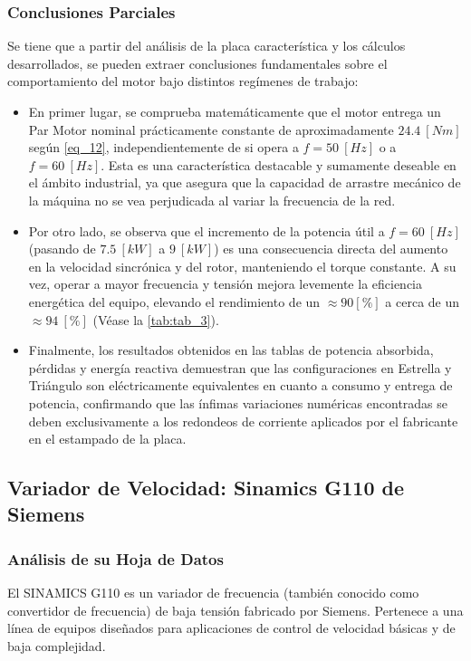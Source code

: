\documentclass[12pt,a4paper]{article}
\begin{document}
\subsubsection{Conclusiones Parciales}
Se tiene que a partir del análisis de la placa característica y los cálculos desarrollados, se pueden extraer conclusiones fundamentales sobre el comportamiento del motor bajo distintos regímenes de trabajo:
\begin{itemize}
    \item En primer lugar, se comprueba matemáticamente que el motor entrega un Par Motor nominal prácticamente constante de aproximadamente $24.4 \ [Nm]$ según \autoref{eq_12}, independientemente de si opera a $f = 50 \ [Hz]$ o a $f = 60 \ [Hz]$. Esta es una característica destacable y sumamente deseable en el ámbito industrial, ya que asegura que la capacidad de arrastre mecánico de la máquina no se vea perjudicada al variar la frecuencia de la red.

    \item Por otro lado, se observa que el incremento de la potencia útil a $f = 60 \ [Hz]$ (pasando de $7.5 \ [kW]$ a $9 \ [kW]$) es una consecuencia directa del aumento en la velocidad sincrónica y del rotor, manteniendo el torque constante. A su vez, operar a mayor frecuencia y tensión mejora levemente la eficiencia energética del equipo, elevando el rendimiento de un $\approx 90 [\%]$ a cerca de un $\approx 94 \ [\%]$ (Véase la \autoref{tab:tab_3}).

    \item Finalmente, los resultados obtenidos en las tablas de potencia absorbida, pérdidas y energía reactiva demuestran que las configuraciones en Estrella y Triángulo son eléctricamente equivalentes en cuanto a consumo y entrega de potencia, confirmando que las ínfimas variaciones numéricas encontradas se deben exclusivamente a los redondeos de corriente aplicados por el fabricante en el estampado de la placa.
\end{itemize}



\subsection{Variador de Velocidad: Sinamics G110 de Siemens}
\subsubsection{Análisis de su Hoja de Datos}
El SINAMICS G110 es un variador de frecuencia (también conocido como convertidor de frecuencia) de baja tensión fabricado por Siemens. Pertenece a una línea de equipos diseñados para aplicaciones de control de velocidad básicas y de baja complejidad.
\end{document}
